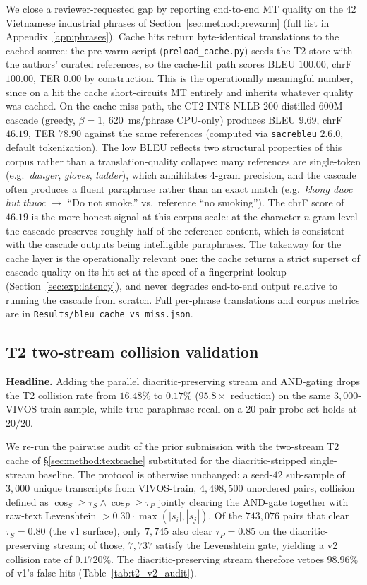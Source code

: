 \documentclass[a4paper,fleqn]{cas-dc}
\begin{document}
We close a reviewer-requested gap by reporting end-to-end MT quality on the $42$ Vietnamese industrial phrases of Section~\ref{sec:method:prewarm} (full list in Appendix~\ref{app:phrases}). Cache hits return byte-identical translations to the cached source: the pre-warm script (\texttt{preload\_cache.py}) seeds the T2 store with the authors' curated references, so the cache-hit path scores BLEU $100.00$, chrF $100.00$, TER $0.00$ by construction. This is the operationally meaningful number, since on a hit the cache short-circuits MT entirely and inherits whatever quality was cached. On the cache-miss path, the CT2 INT8 NLLB-200-distilled-600M cascade (greedy, $\beta = 1$, $620$~ms/phrase CPU-only) produces BLEU $9.69$, chrF $46.19$, TER $78.90$ against the same references (computed via \texttt{sacrebleu} $2.6.0$, default tokenization). The low BLEU reflects two structural properties of this corpus rather than a translation-quality collapse: many references are single-token (e.g.\ \emph{danger}, \emph{gloves}, \emph{ladder}), which annihilates 4-gram precision, and the cascade often produces a fluent paraphrase rather than an exact match (e.g.\ \emph{khong duoc hut thuoc} $\to$ ``Do not smoke.'' vs.\ reference ``no smoking''). The chrF score of $46.19$ is the more honest signal at this corpus scale: at the character $n$-gram level the cascade preserves roughly half of the reference content, which is consistent with the cascade outputs being intelligible paraphrases. The takeaway for the cache layer is the operationally relevant one: the cache returns a strict superset of cascade quality on its hit set at the speed of a fingerprint lookup (Section~\ref{sec:exp:latency}), and never degrades end-to-end output relative to running the cascade from scratch. Full per-phrase translations and corpus metrics are in \texttt{Results/bleu\_cache\_vs\_miss.json}.

\subsection{T2 two-stream collision validation}\label{sec:exp:t2v2}
\textbf{Headline.} Adding the parallel diacritic-preserving stream and AND-gating drops the T2 collision rate from $16.48\%$ to $\mathbf{0.17\%}$ (\textbf{$95.8\times$} reduction) on the same $3{,}000$-VIVOS-train sample, while true-paraphrase recall on a $20$-pair probe set holds at \textbf{$20/20$}.

We re-run the pairwise audit of the prior submission with the two-stream T2 cache of \S\ref{sec:method:textcache} substituted for the diacritic-stripped single-stream baseline. The protocol is otherwise unchanged: a seed-$42$ sub-sample of $3{,}000$ unique transcripts from VIVOS-train, $4{,}498{,}500$ unordered pairs, collision defined as $\cos_{S} \geq \tau_{S} \wedge \cos_{P} \geq \tau_{P}$ jointly clearing the AND-gate together with raw-text Levenshtein $> 0.30 \cdot \max(|s_{i}|, |s_{j}|)$. Of the $743{,}076$ pairs that clear $\tau_{S} = 0.80$ (the v1 surface), only $7{,}745$ also clear $\tau_{P} = 0.85$ on the diacritic-preserving stream; of those, $7{,}737$ satisfy the Levenshtein gate, yielding a v2 collision rate of $0.1720\%$. The diacritic-preserving stream therefore vetoes $98.96\%$ of v1's false hits (Table~\ref{tab:t2_v2_audit}).
\end{document}
